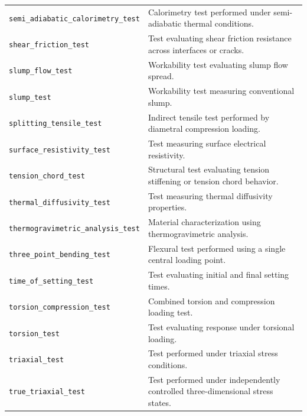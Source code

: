 \documentclass[11pt]{book}
\begin{document}
{\begin{longtable}{p{}p{}}
\texttt{semi\_adiabatic\_calorimetry\_test} &
Calorimetry test performed under semi-adiabatic thermal conditions. \\

\texttt{shear\_friction\_test} &
Test evaluating shear friction resistance across interfaces or cracks. \\

\texttt{slump\_flow\_test} &
Workability test evaluating slump flow spread. \\

\texttt{slump\_test} &
Workability test measuring conventional slump. \\

\texttt{splitting\_tensile\_test} &
Indirect tensile test performed by diametral compression loading. \\

\texttt{surface\_resistivity\_test} &
Test measuring surface electrical resistivity. \\

\texttt{tension\_chord\_test} &
Structural test evaluating tension stiffening or tension chord behavior. \\

\texttt{thermal\_diffusivity\_test} &
Test measuring thermal diffusivity properties. \\

\texttt{thermogravimetric\_analysis\_test} &
Material characterization using thermogravimetric analysis. \\

\texttt{three\_point\_bending\_test} &
Flexural test performed using a single central loading point. \\

\texttt{time\_of\_setting\_test} &
Test evaluating initial and final setting times. \\

\texttt{torsion\_compression\_test} &
Combined torsion and compression loading test. \\

\texttt{torsion\_test} &
Test evaluating response under torsional loading. \\

\texttt{triaxial\_test} &
Test performed under triaxial stress conditions. \\

\texttt{true\_triaxial\_test} &
Test performed under independently controlled three-dimensional stress states. \\


\end{longtable}}
\end{document}
